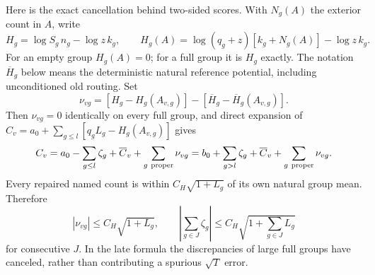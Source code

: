 Here is the exact cancellation behind two-sided scores.  With $N_g(A)$
the exterior count in $A$, write
\[
 H_g=\log S_g\,n_g-\log z\,k_g,\qquad
 H_g(A)=\log(q_g+z)[k_g+N_g(A)]-\log z\,k_g.
\]
For an empty group $H_g(A)=0$; for a full group it is $H_g$ exactly.
The notation $\overline H_g$ below means the deterministic natural
reference potential, including unconditioned old routing.  Set
\[
 \nu_{vg}=[H_g-H_g(A_{v,g})]
                  -[\overline H_g-\overline H_g(A_{v,g})].
\]
Then $\nu_{vg}=0$ identically on every full group, and direct expansion
of $C_v=a_0+\sum_{g\leq l}[q_gL_g-H_g(A_{v,g})]$ gives
\begin{equation}\label{paper:ep-exact-residual}
 C_v=a_0-\sum_{g\leq l}\zeta_g+\overline C_v
                   +\sum_{g\ {\rm proper}}\nu_{vg}
     =b_0+\sum_{g>l}\zeta_g+\overline C_v
                   +\sum_{g\ {\rm proper}}\nu_{vg}.
\end{equation}
Every repaired named count is within $C_H\sqrt{1+L_g}$ of its own
natural group mean.  Therefore
\begin{equation}\label{paper:ep-residual-central}
 |\nu_{vg}|\leq C_H\sqrt{1+L_g},\qquad
 \left|\sum_{g\in J}\zeta_g\right|
                  \leq C_H\sqrt{1+\sum_{g\in J}L_g}
\end{equation}
for consecutive $J$.  In the late formula the discrepancies of large
full groups have canceled, rather than contributing a spurious
$\sqrt T$ error.

